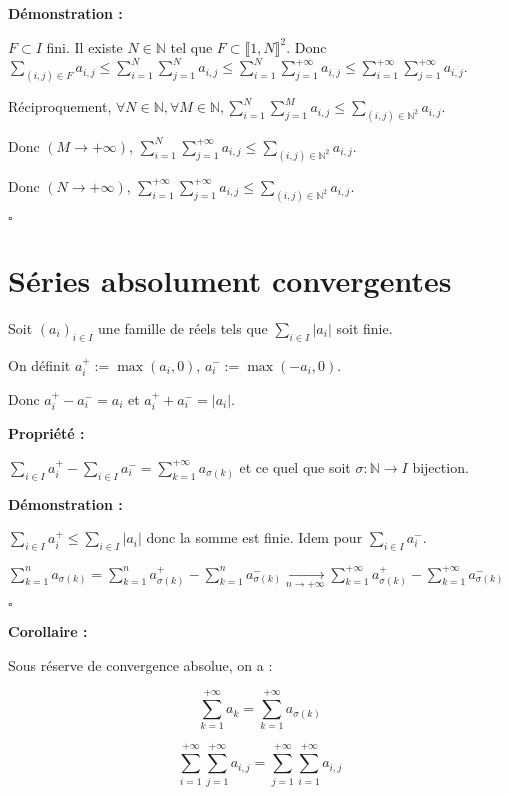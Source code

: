 \documentclass[10pt,a4paper,notitlepage ]{report}
\newcommand{\1}{\mathds 1}
\newcounter{th}
\newenvironment{propriete}[1][]{
	\begin{tcolorbox}
		\textbf{Propriété #1 : }
}
{\end{tcolorbox}}
\newenvironment{demo}[1][]{

	\textbf{Démonstration #1 :}
}{\begin{flushright}
	$\square$
\end{flushright}
}
\newenvironment{corollaire}{
	\begin{tcolorbox}
		\textbf{Corollaire : }
	}
	{\end{tcolorbox}}
\begin{document}
\begin{demo}
	$F\subset I$ fini. Il existe $N \in \mathbb N$ tel que $F \subset \llbracket 1,N\rrbracket^2$. Donc $\sum_{(i,j)\in F}a_{i,j} \le \sum_{i=1}^{N}\sum_{j=1}^{N}a_{i,j} \le
	\sum_{i=1}^N\sum_{j=1}^{+\infty}a_{i,j} \le
	\sum_{i=1}^{+\infty}\sum_{j=1}^{+\infty}a_{i,j}$.
	
	Réciproquement, $\forall N\in\mathbb N, \forall M \in\mathbb N, \sum_{i=1}^N\sum_{j=1}^Ma_{i,j} \le
	\sum_{(i,j)\in \mathbb N^2}a_{i,j}$.
	
	Donc $(M\rightarrow +\infty)$, $\sum_{i=1}^N\sum_{j=1}^{+\infty}a_{i,j} \le
	\sum_{(i,j)\in \mathbb N^2}a_{i,j}$.
	
	Donc $(N\rightarrow +\infty)$, $\sum_{i=1}^{+\infty}\sum_{j=1}^{+\infty}a_{i,j} \le
	\sum_{(i,j)\in \mathbb N^2}a_{i,j}$.
\end{demo}

\section{Séries absolument convergentes}

Soit $(a_i)_{i\in I}$ une famille de réels tels que $\sum_{i\in I}|a_i|$ soit finie.

On définit $a_i^+ := \max(a_i,0)$, $a_i^- := \max(-a_i, 0)$.

Donc $a_i^+ - a_i^- = a_i$ et $a_i^+ + a_i^- = |a_i|$.

\begin{propriete}
	$\sum_{i\in I}a_i^+ - \sum_{i\in I}a_i^- = \sum_{k=1}^{+\infty}a_{\sigma(k)}$ et ce quel que soit $\sigma : \mathbb N \rightarrow I$ bijection.
\end{propriete}

\begin{demo}
	$\sum_{i\in I}a_i^+ \le \sum_{i\in I} |a_i|$ donc la somme est finie. Idem pour $\sum_{i\in I}a_i^-$.
	
	$\sum_{k=1}^n a_{\sigma(k)} = \sum_{k=1}^n a_{\sigma(k)}^+ - \sum_{k=1}^n a_{\sigma(k)}^- \underset{n\rightarrow +\infty}{\rightarrow}
	\sum_{k=1}^{+\infty}a_{\sigma(k)}^+ - \sum_{k=1}^{+\infty}a_{\sigma(k)}^-$
\end{demo}
\begin{corollaire}
	Sous réserve de convergence absolue, on a :
	
	\[\sum_{k=1}^{+\infty}a_k = \sum_{k=1}^{+\infty} a_{\sigma(k)}\]
	
	\[\sum_{i=1}^{+\infty}\sum_{j=1}^{+\infty}a_{i,j} =
	\sum_{j=1}^{+\infty}\sum_{i=1}^{+\infty}a_{i,j}\]
\end{corollaire}
\end{document}
